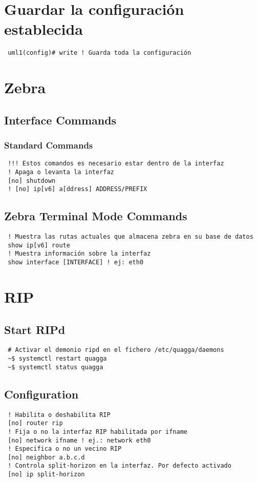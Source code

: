 \documentclass{article}
\begin{document}
\section{Guardar la configuración establecida}
\begin{verbatim}
 uml1(config)# write ! Guarda toda la configuración
\end{verbatim}

\section{Zebra}
\subsection{Interface Commands}
\subsubsection{Standard Commands}
\begin{verbatim}
 !!! Estos comandos es necesario estar dentro de la interfaz
 ! Apaga o levanta la interfaz
 [no] shutdown
 ! [no] ip[v6] a[ddress] ADDRESS/PREFIX
\end{verbatim}

\subsection{Zebra Terminal Mode Commands}
\begin{verbatim}
 ! Muestra las rutas actuales que almacena zebra en su base de datos
 show ip[v6] route
 ! Muestra información sobre la interfaz
 show interface [INTERFACE] ! ej: eth0
\end{verbatim}

\section{RIP}
\subsection{Start RIPd}
\begin{verbatim}
 # Activar el demonio ripd en el fichero /etc/quagga/daemons
 ~$ systemctl restart quagga
 ~$ systemctl status quagga
\end{verbatim}

\subsection{Configuration}
\begin{verbatim}
 ! Habilita o deshabilita RIP
 [no] router rip
 ! Fija o no la interfaz RIP habilitada por ifname
 [no] network ifname ! ej.: network eth0
 ! Especifica o no un vecino RIP
 [no] neighbor a.b.c.d
 ! Controla split-horizon en la interfaz. Por defecto activado
 [no] ip split-horizon
\end{verbatim}
\end{document}
